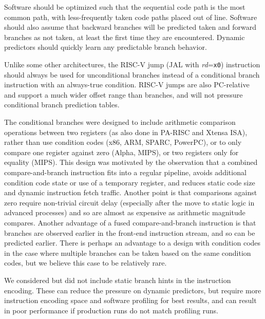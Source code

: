 Software should be optimized such that the sequential code path is the
most common path, with less-frequently taken code paths placed out of
line.  Software should also assume that backward branches will be
predicted taken and forward branches as not taken, at least the
first time they are encountered.  Dynamic predictors should quickly
learn any predictable branch behavior.

Unlike some other architectures, the RISC-V jump (JAL with {\em
  rd}={\tt x0}) instruction should always be used for unconditional
branches instead of a conditional branch instruction with an always-true
condition.  RISC-V jumps are also PC-relative and support a much
wider offset range than branches, and will not pressure conditional
branch prediction tables.

\begin{commentary}
The conditional branches were designed to include arithmetic
comparison operations between two registers (as also done in PA-RISC
and Xtensa ISA), rather than use condition codes (x86, ARM, SPARC,
PowerPC), or to only compare one register against zero (Alpha, MIPS),
or two registers only for equality (MIPS).  This design was motivated
by the observation that a combined compare-and-branch instruction fits
into a regular pipeline, avoids additional condition code state or use
of a temporary register, and reduces static code size and dynamic
instruction fetch traffic.  Another point is that comparisons against
zero require non-trivial circuit delay (especially after the move to
static logic in advanced processes) and so are almost as expensive as
arithmetic magnitude compares.  Another advantage of a fused
compare-and-branch instruction is that branches are observed earlier
in the front-end instruction stream, and so can be predicted earlier.
There is perhaps an advantage to a design with condition codes in the
case where multiple branches can be taken based on the same condition
codes, but we believe this case to be relatively rare.

We considered but did not include static branch hints in the
instruction encoding.  These can reduce the pressure on dynamic
predictors, but require more instruction encoding space and
software profiling for best results, and can result in poor
performance if production runs do not match profiling runs.


\end{commentary}
